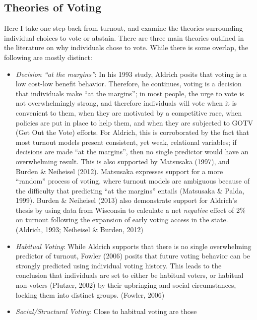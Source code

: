 \documentclass[12pt,twoside]{reedthesis}
\begin{document}
  \subsection{Theories of Voting}\label{theories-of-voting}
  
  Here I take one step back from turnout, and examine the theories
  surrounding individual choices to vote or abstain. There are three main
  theories outlined in the literature on why individuals chose to vote.
  While there is some overlap, the following are mostly distinct:
  
  \begin{itemize}
  \item
    \emph{Decision ``at the margins''}: In his 1993 study, Aldrich posits
    that voting is a low cost-low benefit behavior. Therefore, he
    continues, voting is a decision that individuals make ``at the
    margins''; in most people, the urge to vote is not overwhelmingly
    strong, and therefore individuals will vote when it is convenient to
    them, when they are motivated by a competitive race, when policies are
    put in place to help them, and when they are subjected to GOTV (Get
    Out the Vote) efforts. For Aldrich, this is corroborated by the fact
    that most turnout models present consistent, yet weak, relational
    variables; if decisions are made ``at the margins'', then no single
    predictor would have an overwhelming result. This is also supported by
    Matsusaka (1997), and Burden \& Neiheisel (2012). Matsusaka expresses
    support for a more ``random'' process of voting, where turnout models
    are ambiguous because of the difficulty that predicting ``at the
    margins'' entails (Matsusaka \& Palda, 1999). Burden \& Neiheisel
    (2013) also demonstrate support for Aldrich's thesis by using data
    from Wisconsin to calculate a net \emph{negative} effect of 2\% on
    turnout following the expansion of early voting access in the state.
    (Aldrich, 1993; Neiheisel \& Burden, 2012)
  \item
    \emph{Habitual Voting}: While Aldrich supports that there is no single
    overwhelming predictor of turnout, Fowler (2006) posits that future
    voting behavior can be strongly predicted using individual voting
    history. This leads to the conclusion that individuals are set to
    either be habitual voters, or habitual non-voters (Plutzer, 2002) by
    their upbringing and social circumstances, locking them into distinct
    groups. (Fowler, 2006)
  \item
    \emph{Social/Structural Voting}: Close to habitual voting are those

\end{itemize}
\end{document}
